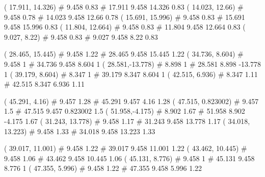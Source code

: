 \documentclass[a4paper,openbib,10pt]{article}
\newenvironment{treegraph}{\begin{graph}}{\end{graph}}
\begin{document}
\begin{treegraph}
  ( 17.911, 14.326) #     9.458    0.83
   #    17.911    9.458    14.326    0.83
  ( 14.023, 12.66) #     9.458    0.78
   #    14.023    9.458    12.66    0.78
  ( 15.691, 15.996) #     9.458    0.83
   #    15.691    9.458    15.996    0.83
  ( 11.804, 12.664) #     9.458    0.83
   #    11.804    9.458    12.664    0.83
  ( 9.027, 8.22) #     9.458    0.83
   #    9.027    9.458    8.22    0.83

  ( 28.465, 15.445) #     9.458    1.22
   #    28.465    9.458    15.445    1.22
  ( 34.736, 8.604) #     9.458    1
   #    34.736    9.458    8.604    1
  ( 28.581,-13.778) #     8.898    1
   #    28.581    8.898    -13.778    1
  ( 39.179, 8.604) #     8.347    1
   #    39.179    8.347    8.604    1
  ( 42.515, 6.936) #     8.347    1.11
   #    42.515    8.347    6.936    1.11

  ( 45.291, 4.16) #     9.457    1.28
   #    45.291    9.457    4.16    1.28
  ( 47.515, 0.823002) #     9.457    1.5
   #    47.515    9.457    0.823002    1.5
  ( 51.958,-4.175) #     8.902    1.67
   #    51.958    8.902    -4.175    1.67
  ( 31.243, 13.778) #     9.458    1.17
   #    31.243    9.458    13.778    1.17
  ( 34.018, 13.223) #     9.458    1.33
   #    34.018    9.458    13.223    1.33

  ( 39.017, 11.001) #     9.458    1.22
   #    39.017    9.458    11.001    1.22
  ( 43.462, 10.445) #     9.458    1.06
   #    43.462    9.458    10.445    1.06
  ( 45.131, 8.776) #     9.458    1
   #    45.131    9.458    8.776    1
  ( 47.355, 5.996) #     9.458    1.22
   #    47.355    9.458    5.996    1.22
\end{treegraph}
\end{document}
